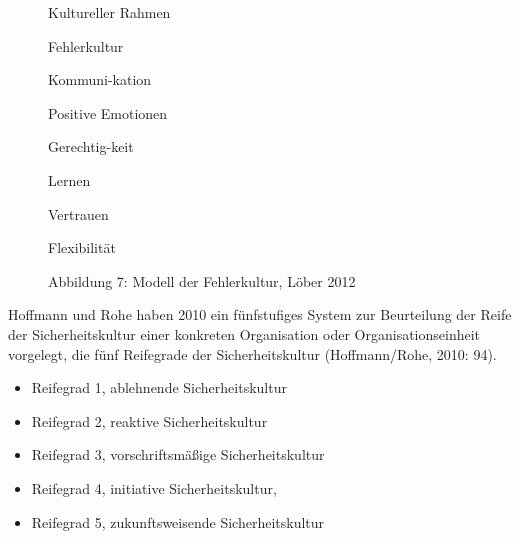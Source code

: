 \begin{figure}

\centering
\begin{minipage}{44.49mm}
Kultureller Rahmen
\end{minipage}

\centering
\begin{minipage}{50.78mm}
Fehlerkultur
\end{minipage}

\centering
\begin{minipage}{26mm}
Kommuni-kation
\end{minipage}

\centering
\begin{minipage}{26mm}
Positive Emotionen
\end{minipage}


\centering
\begin{minipage}{26mm}
Gerechtig-keit
\end{minipage}

\centering
\begin{minipage}{26mm}
Lernen
\end{minipage}

\centering
\begin{minipage}{26mm}
Vertrauen
\end{minipage}

\centering
\begin{minipage}{26mm}
Flexibilität
\end{minipage}


\caption{Abbildung 7: Modell der Fehlerkultur, Löber 2012}
\end{figure}


Hoffmann und Rohe haben 2010 ein fünfstufiges System zur
Beurteilung der Reife der Sicherheitskultur einer konkreten
Organisation oder Organisationseinheit vorgelegt, die fünf
Reifegrade der Sicherheitskultur (Hoffmann/Rohe, 2010: 94).

\begin{itemize}
  \item Reifegrad 1, ablehnende Sicherheitskultur
  \item Reifegrad 2, reaktive Sicherheitskultur
  \item Reifegrad 3, vorschriftsmäßige Sicherheitskultur
  \item Reifegrad 4, initiative Sicherheitskultur,
  \item Reifegrad 5, zukunftsweisende Sicherheitskultur
\end{itemize}



